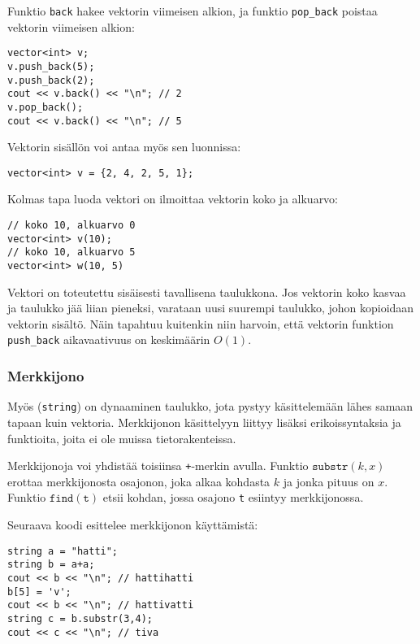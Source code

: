 Funktio \texttt{back} hakee vektorin viimeisen alkion,
ja funktio \texttt{pop\_back} poistaa vektorin
viimeisen alkion:

\begin{lstlisting}
vector<int> v;
v.push_back(5);
v.push_back(2);
cout << v.back() << "\n"; // 2
v.pop_back();
cout << v.back() << "\n"; // 5
\end{lstlisting}

Vektorin sisällön voi antaa myös sen luonnissa:

\begin{lstlisting}
vector<int> v = {2, 4, 2, 5, 1};
\end{lstlisting}

Kolmas tapa luoda vektori on ilmoittaa
vektorin koko ja alkuarvo:

\begin{lstlisting}
// koko 10, alkuarvo 0
vector<int> v(10);
// koko 10, alkuarvo 5
vector<int> w(10, 5)
\end{lstlisting}

Vektori on toteutettu sisäisesti tavallisena taulukkona.
Jos vektorin koko kasvaa ja taulukko jää liian pieneksi,
varataan uusi suurempi taulukko, johon kopioidaan
vektorin sisältö.
Näin tapahtuu kuitenkin niin harvoin, että vektorin
funktion \texttt{push\_back} aikavaativuus on
keskimäärin $O(1)$.

\subsubsection{Merkkijono}


Myös  (\texttt{string}) on dynaaminen taulukko,
jota pystyy käsittelemään lähes samaan
tapaan kuin vektoria.
Merkkijonon käsittelyyn liittyy lisäksi erikoissyntaksia
ja funktioita, joita ei ole muissa tietorakenteissa.

Merkkijonoja voi yhdistää toisiinsa \texttt{+}-merkin avulla.
Funktio $\texttt{substr}(k,x)$ erottaa merkkijonosta
osajonon, joka alkaa kohdasta $k$ ja jonka pituus on $x$.
Funktio $\texttt{find}(\texttt{t})$ etsii kohdan,
jossa osajono \texttt{t} esiintyy merkkijonossa.

Seuraava koodi esittelee merkkijonon käyttämistä:

\begin{lstlisting}
string a = "hatti";
string b = a+a;
cout << b << "\n"; // hattihatti
b[5] = 'v';
cout << b << "\n"; // hattivatti
string c = b.substr(3,4);
cout << c << "\n"; // tiva
\end{lstlisting}

